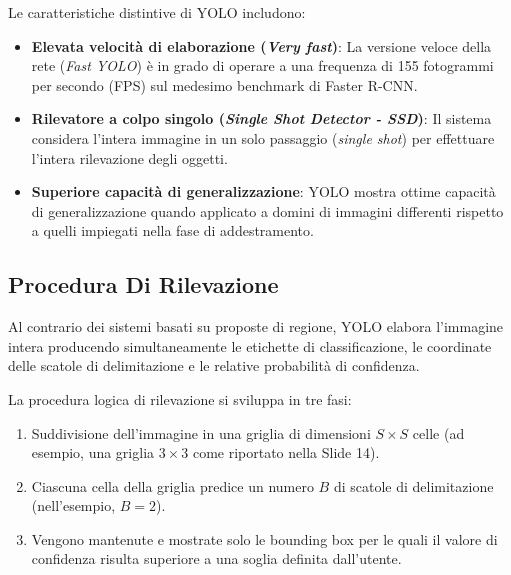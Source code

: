 ﻿\documentclass[11pt, a4paper]{article}
\begin{document}
Le caratteristiche distintive di YOLO includono:
\begin{itemize}
    \item \textbf{Elevata velocità di elaborazione (\emph{Very fast})}: La versione veloce della rete (\emph{Fast YOLO}) è in grado di operare a una frequenza di 155 fotogrammi per secondo (FPS) sul medesimo benchmark di Faster R-CNN.
    \item \textbf{Rilevatore a colpo singolo (\emph{Single Shot Detector - SSD})}: Il sistema considera l'intera immagine in un solo passaggio (\emph{single shot}) per effettuare l'intera rilevazione degli oggetti.
    \item \textbf{Superiore capacità di generalizzazione}: YOLO mostra ottime capacità di generalizzazione quando applicato a domini di immagini differenti rispetto a quelli impiegati nella fase di addestramento.
\end{itemize}

\newpage

\subsection{Procedura Di Rilevazione}

Al contrario dei sistemi basati su proposte di regione, YOLO elabora l'immagine intera producendo simultaneamente le etichette di classificazione, le coordinate delle scatole di delimitazione e le relative probabilità di confidenza.


La procedura logica di rilevazione si sviluppa in tre fasi:

\begin{enumerate}
    \item Suddivisione dell'immagine in una griglia di dimensioni $S \times S$ celle (ad esempio, una griglia $3 \times 3$ come riportato nella Slide 14).
    \item Ciascuna cella della griglia predice un numero $B$ di scatole di delimitazione (nell'esempio, $B = 2$).
    \item Vengono mantenute e mostrate solo le bounding box per le quali il valore di confidenza risulta superiore a una soglia definita dall'utente.
\end{enumerate}

\end{document}
